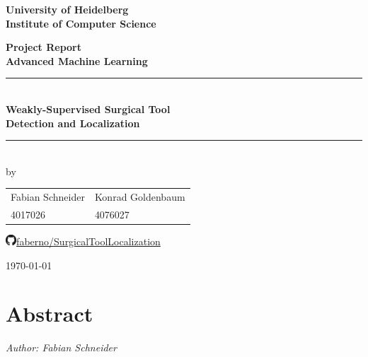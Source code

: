 \documentclass[
     12pt,         %
     a4paper,      %
     DIV=14,        %
     ]{scrreprt}
\date{\today}
\begin{document}
\begin{titlepage}


\vspace*{1cm}
\begin{center}
\vspace*{3cm}
\textbf{ 
\Large University of Heidelberg\\
\smallskip
\Large Institute of Computer Science\\
\smallskip
}

\vspace{2cm}

\textbf{\Large Project Report\\[0.4 cm]	 \large Advanced Machine Learning} %

\vspace{1.5\baselineskip}
\rule{\linewidth}{0.2 mm} \\[0.4 cm]
{\huge
\textbf{Weakly-Supervised Surgical Tool}\\
\bigskip
\textbf{Detection and Localization}
}\\
\bigskip
\rule{\linewidth}{0.2 mm} \\[1.0 cm]

by\\[0.5cm]


\begin{table}[h]
	\large
	\centering
	\begin{tabular}{P{5.5cm}P{5cm}}
		Fabian Schneider & Konrad Goldenbaum \\ 
		4017026 & 4076027 \\
	\end{tabular}
\end{table}

\vspace{0.5cm}
\includegraphics[width=0.4cm]{github}\hspace{0.15cm}\href{https://github.com/faberno/SurgicalToolLocalization}{faberno/SurgicalToolLocalization}
\vfill

\today


\end{center}

\end{titlepage}

\chapter*{Abstract}
\textit{Author: Fabian Schneider}
\newline

\end{document}
